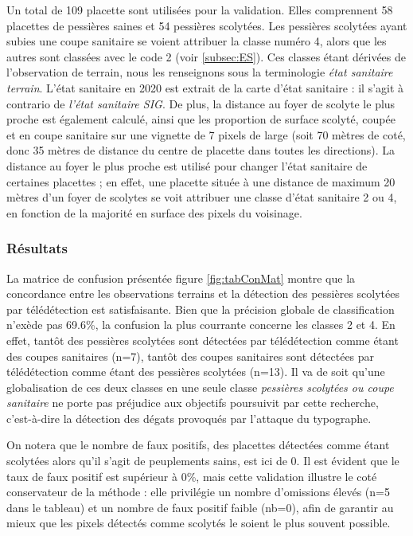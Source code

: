 \documentclass[a4paper, 12pt]{article} %
\begin{document}
Un total de 109 placette sont utilisées pour la validation. Elles comprennent 58 placettes de pessières saines et 54 pessières scolytées. Les pessières scolytées ayant subies une coupe sanitaire se voient attribuer la classe numéro 4, alors que les autres sont classées avec le code 2 (voir \ref{subsec:ES}). Ces classes étant dérivées de l'observation de terrain, nous les renseignons sous la terminologie \textit{état sanitaire terrain}. L'état sanitaire en 2020 est extrait de la carte d'état sanitaire : il s'agit à contrario de \textit{l'état sanitaire SIG}. De plus, la distance au foyer de scolyte le plus proche est également calculé, ainsi que les proportion de surface scolyté, coupée et en coupe sanitaire sur une vignette de 7 pixels de large (soit 70 mètres de coté, donc 35 mètres de distance du centre de placette dans toutes les directions). La distance au foyer le plus proche est utilisé pour changer l'état sanitaire de certaines placettes ; en effet, une placette située à une distance de maximum 20 mètres d'un foyer de scolytes se voit attribuer une classe d'état sanitaire 2 ou 4, en fonction de la majorité en surface des pixels du voisinage.


\subsubsection{Résultats}

La matrice de confusion présentée figure \ref{fig:tabConMat} montre que la concordance entre les observations terrains et la détection des pessières scolytées par télédétection est satisfaisante. Bien que la précision globale de classification n'exède pas 69.6\%, la confusion la plus courrante concerne les classes 2 et 4. En effet, tantôt des pessières scolytées sont détectées par télédétection comme étant des coupes sanitaires (n=7), tantôt des coupes sanitaires sont détectées par télédétection comme étant des pessières scolytées (n=13). Il va de soit qu'une globalisation de ces deux classes en une seule classe \textit{pessières scolytées ou coupe sanitaire} ne porte pas préjudice aux objectifs poursuivit par cette recherche, c'est-à-dire la détection des dégats provoqués par l'attaque du typographe.

On notera que le nombre de faux positifs, des placettes détectées comme étant scolytées alors qu'il s'agit de peuplements sains, est ici de 0. Il est évident que le taux de faux positif est supérieur à 0\%, mais cette validation illustre le coté conservateur de la méthode : elle privilégie un nombre d'omissions élevés (n=5 dans le tableau) et un nombre de faux positif faible (nb=0), afin de garantir au mieux que les pixels détectés comme scolytés le soient le plus souvent possible.
\end{document}

